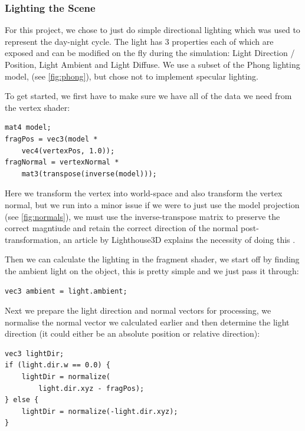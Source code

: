 \documentclass{article}
\begin{document}
\begin{multicols}{2}
                \subsubsection{Lighting the Scene}

                    For this project, we chose to just do simple directional lighting which was used to represent the day-night cycle. The light has 3 properties each of which are exposed and can be modified on the fly during the simulation: Light Direction / Position, Light Ambient and Light Diffuse. We use a subset of the Phong lighting model, (see \autoref{fig:phong}), but chose not to implement specular lighting.
    
                    To get started, we first have to make sure we have all of the data we need from the vertex shader:
                    
                    \begin{lstlisting}
mat4 model;
fragPos = vec3(model *
    vec4(vertexPos, 1.0));
fragNormal = vertexNormal *
    mat3(transpose(inverse(model)));\end{lstlisting}

                    Here we transform the vertex into world-space and also transform the vertex normal, but we run into a minor issue if we were to just use the model projection (see \autoref{fig:normals}), we must use the inverse-transpose matrix to preserve the correct magntiude and retain the correct direction of the normal post-transformation, an article by Lighthouse3D explains the necessity of doing this \cite{lighthouse3d}.

                    Then we can calculate the lighting in the fragment shader, we start off by finding the ambient light on the object, this is pretty simple and we just pass it through:

                    \begin{lstlisting}
vec3 ambient = light.ambient;\end{lstlisting}

                    Next we prepare the light direction and normal vectors for processing, we normalise the normal vector we calculated earlier and then determine the light direction (it could either be an absolute position or relative direction):

                    \begin{lstlisting}
vec3 lightDir;
if (light.dir.w == 0.0) {
    lightDir = normalize(
        light.dir.xyz - fragPos);
} else {
    lightDir = normalize(-light.dir.xyz);
}\end{lstlisting}


\end{multicols}
\end{document}
